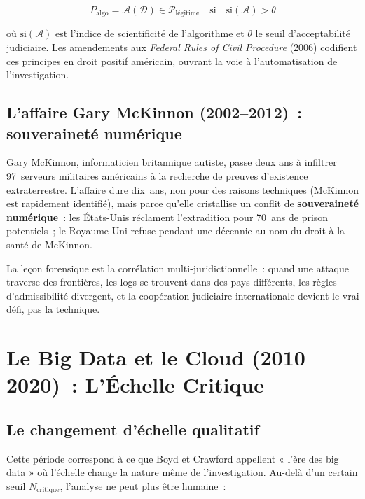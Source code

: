 \begin{equation}
P_{\text{algo}} = \mathcal{A}(\mathcal{D}) \in \mathcal{P}_{\text{légitime}}
\quad \text{si} \quad \mathrm{si}(\mathcal{A}) > \theta
\label{eq:preuve-algo}
\end{equation}

où $\mathrm{si}(\mathcal{A})$ est l'indice de scientificité de l'algorithme et
$\theta$ le seuil d'acceptabilité judiciaire. Les amendements aux
\textit{Federal Rules of Civil Procedure} (2006) codifient ces principes
en droit positif américain, ouvrant la voie à l'automatisation de l'investigation.

\subsection{L'affaire Gary McKinnon (2002--2012)~: souveraineté numérique}

Gary McKinnon, informaticien britannique autiste, passe deux ans à infiltrer
97~serveurs militaires américains à la recherche de preuves d'existence
extraterrestre. L'affaire dure dix~ans, non pour des raisons techniques (McKinnon
est rapidement identifié), mais parce qu'elle cristallise un conflit de
\textbf{souveraineté numérique}~: les États-Unis réclament l'extradition
pour 70~ans de prison potentiels~; le Royaume-Uni refuse pendant une décennie
au nom du droit à la santé de McKinnon.

\medskip

La leçon forensique est la corrélation multi-juridictionnelle~: quand une
attaque traverse des frontières, les logs se trouvent dans des pays différents,
les règles d'admissibilité divergent, et la coopération judiciaire internationale
devient le vrai défi, pas la technique.

\section{Le Big Data et le Cloud (2010--2020)~: L'Échelle Critique}

\subsection{Le changement d'échelle qualitatif}

Cette période correspond à ce que Boyd et Crawford appellent « l'ère des
big data » où l'échelle change la nature même de l'investigation. Au-delà
d'un certain seuil $N_{\text{critique}}$, l'analyse ne peut plus être humaine~:


